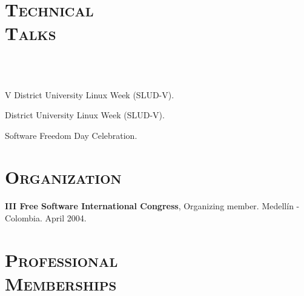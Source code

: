 \begin{resume}
\section{\textsc{Technical \\ Talks}}

\begin{formatb}
  \\
  \\
   \body
\end{formatb}

\begin{position}
V District University Linux Week (SLUD-V).
\end{position}

\begin{position}
District  University Linux Week (SLUD-V).
\end{position}

\begin{position}
Software Freedom Day Celebration.
\end{position}


\section{\textsc{Organization}}
\employer{\textbf{}}
\dates{}
\textbf{III Free Software International Congress}, Organizing member. Medell\'{i}n - Colombia. April 2004.
\newline     
\newline
\newline
\newline     
\newline
\newline     


\section{\textsc{Professional\\ Memberships}}


\end{resume}
